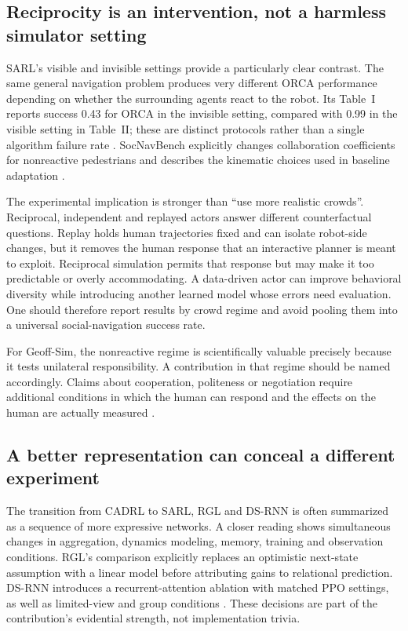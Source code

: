 \subsection{Reciprocity is an intervention, not a harmless simulator setting}
SARL's visible and invisible settings provide a particularly clear contrast.
The same general navigation problem produces very different ORCA performance
depending on whether the surrounding agents react to the robot. Its Table~I
reports success 0.43 for ORCA in the invisible setting, compared with 0.99 in
the visible setting in Table~II; these are distinct protocols rather than a
single algorithm failure rate \citep{sarl}. SocNavBench explicitly changes
collaboration coefficients for nonreactive pedestrians and describes the
kinematic choices used in baseline adaptation \citep{socnavbench}.

The experimental implication is stronger than ``use more realistic crowds''.
Reciprocal, independent and replayed actors answer different counterfactual
questions. Replay holds human trajectories fixed and can isolate robot-side
changes, but it removes the human response that an interactive planner is meant
to exploit. Reciprocal simulation permits that response but may make it too
predictable or overly accommodating. A data-driven actor can improve behavioral
diversity while introducing another learned model whose errors need evaluation.
One should therefore report results by crowd regime and avoid pooling them into
a universal social-navigation success rate.

For Geoff-Sim, the nonreactive regime is scientifically valuable precisely
because it tests unilateral responsibility. A contribution in that regime should
be named accordingly. Claims about cooperation, politeness or negotiation require
additional conditions in which the human can respond and the effects on the
human are actually measured \citep{survey2013,guidelines,proxemics2026}.

\subsection{A better representation can conceal a different experiment}
The transition from CADRL to SARL, RGL and DS-RNN is often summarized as a
sequence of more expressive networks. A closer reading shows simultaneous changes
in aggregation, dynamics modeling, memory, training and observation conditions.
RGL's comparison explicitly replaces an optimistic next-state assumption with a
linear model before attributing gains to relational prediction. DS-RNN introduces
a recurrent-attention ablation with matched PPO settings, as well as limited-view
and group conditions \citep{cadrl,sarl,rgl,dsrnn}. These decisions are part of
the contribution's evidential strength, not implementation trivia.

